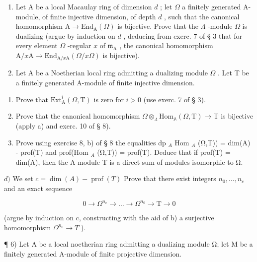 \begin{enumerate}
\def\labelenumi{\arabic{enumi})}
\setcounter{enumi}{3}
\item
  Let A be a local Macaulay ring of dimension \(d\) ; let \(\Omega\) a finitely generated A-module, of finite injective dimension, of depth \(d\) , such that the canonical homomorphism \(\mathrm{A} \to \mathrm{End}_{\mathrm{A}}(\Omega)\) is bijective. Prove that the \(\Lambda\) -module \(\Omega\) is dualizing (argue by induction on \(d\) , deducing from exerc. 7 of § 3 that for every element \(\Omega\) -regular \(x\) of \(\mathfrak{m}_{\mathrm{A}}\) , the canonical homomorphism \(\mathrm{A}/x\mathrm{A} \to \mathrm{End}_{\mathrm{A}/x\mathrm{A}}(\Omega/x\Omega)\) is bijective).
\item
  Let A be a Noetherian local ring admitting a dualizing module \(\Omega\) . Let T be a finitely generated A-module of finite injective dimension.
\end{enumerate}

\begin{enumerate}
\def\labelenumi{\alph{enumi})}
\item
  Prove that \(\mathrm{Ext}_{\mathrm{A}}^{i}(\Omega, \mathrm{T})\) is zero for \(i > 0\) (use exerc. 7 of § 3).
\item
  Prove that the canonical homomorphism \(\Omega\otimes_{\Lambda}\mathrm{Hom}_{\mathbb{A}}(\Omega,\mathrm{T})\to\mathrm{T}\) is bijective (apply a) and exerc. 10 of § 8).
\item
  Prove using exercise 8, b) of § 8 the equalities dp \(_{A}\) Hom \(_{A}\) (Ω,T)) = dim(A) - prof(T) and prof(Hom \(_{A}\) (Ω,T)) = prof(T). Deduce that if prof(T) = dim(A), then the A-module T is a direct sum of modules isomorphic to Ω.
\end{enumerate}

\(d)\) We set \(c = \dim(A) - \operatorname{prof}(T)\) Prove that there exist integers \(n_0, \ldots, n_c\) and an exact sequence

\[
0 \rightarrow \Omega^ {n _ {c}} \rightarrow \dots \rightarrow \Omega^ {n _ {0}} \rightarrow \mathrm{T} \rightarrow 0
\]

(argue by induction on c, constructing with the aid of b) a surjective homomorphism \(\Omega^{n_{0}} \to T\) ).

¶ 6) Let A be a local noetherian ring admitting a dualizing module Ω; let M be a finitely generated A-module of finite projective dimension.

